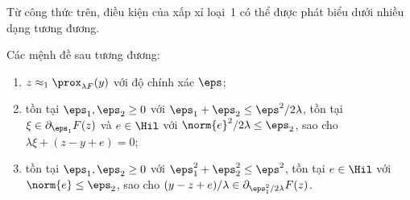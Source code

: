 Từ công thức trên, điều kiện của xấp xỉ loại~1 có thể được phát biểu dưới
nhiều dạng tương đương.
\begin{lemma}
\label{lem:equiv-AT1}
Các mệnh đề sau tương đương:
\begin{enumerate}
  \item $z\approx_1 \prox_{\lambda F}(y)$ với độ chính xác $\eps$;
  \item tồn tại $\eps_1,\eps_2\ge0$ với $\eps_1+\eps_2\le\eps^2/2\lambda$,
        tồn tại $\xi\in\partial_{\eps_1}F(z)$ và $e\in\Hil$ với
        $\norm{e}^2/2\lambda \le \eps_2$, sao cho $\lambda\xi+(z-y+e)=0$;
  \item tồn tại $\eps_1,\eps_2\ge0$ với $\eps_1^2+\eps_2^2\le\eps^2$, tồn
        tại $e\in\Hil$ với $\norm{e}\le\eps_2$, sao cho
        $(y-z+e)/\lambda \in \partial_{\eps_1^2/2\lambda}F(z)$.
\end{enumerate}
\end{lemma}
